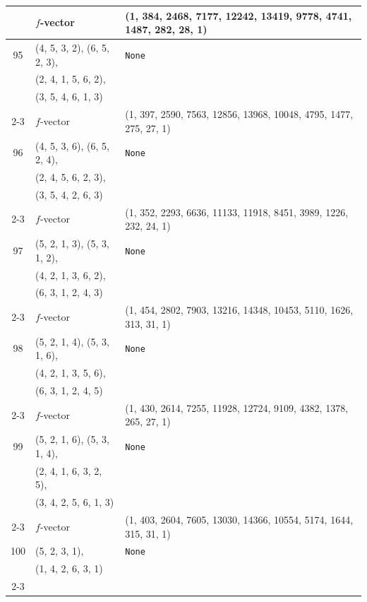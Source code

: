 \documentclass[10pt]{amsart}
\numberwithin{equation}{section}
\theoremstyle{plain}
\theoremstyle{definition}
\theoremstyle{remark}
\begin{document}
{\begin{longtable}{c|l|l}
		& $f$-vector & {(1, 384, 2468, 7177, 12242, 13419, 9778, 4741, 1487, 282, 28, 1)} \\
		\midrule
		
		95 & (4, 5, 3, 2), (6, 5, 2, 3), & \texttt{None} \\
		& (2, 4, 1, 5, 6, 2), &  \\
		& (3, 5, 4, 6, 1, 3) &  \\ \cline{2-3}
		
		& $f$-vector & {(1, 397, 2590, 7563, 12856, 13968, 10048, 4795, 1477, 275, 27, 1)} \\
		\midrule
		
		96 & (4, 5, 3, 6), (6, 5, 2, 4), & \texttt{None} \\
		& (2, 4, 5, 6, 2, 3), &  \\
		& (3, 5, 4, 2, 6, 3) &  \\ \cline{2-3}
		
		& $f$-vector & {(1, 352, 2293, 6636, 11133, 11918, 8451, 3989, 1226, 232, 24, 1)} \\
		\midrule
		
		97 & (5, 2, 1, 3), (5, 3, 1, 2), & \texttt{None} \\
		& (4, 2, 1, 3, 6, 2), &  \\
		& (6, 3, 1, 2, 4, 3) &  \\ \cline{2-3}
		
		& $f$-vector & {(1, 454, 2802, 7903, 13216, 14348, 10453, 5110, 1626, 313, 31, 1)} \\
		\midrule
		
		98 & (5, 2, 1, 4), (5, 3, 1, 6), & \texttt{None} \\
		& (4, 2, 1, 3, 5, 6), &  \\
		& (6, 3, 1, 2, 4, 5) &  \\ \cline{2-3}
		
		& $f$-vector & {(1, 430, 2614, 7255, 11928, 12724, 9109, 4382, 1378, 265, 27, 1)} \\
		\midrule
		
		99 & (5, 2, 1, 6), (5, 3, 1, 4), & \texttt{None} \\
		& (2, 4, 1, 6, 3, 2, 5), &  \\
		& (3, 4, 2, 5, 6, 1, 3) &  \\ \cline{2-3}
		
		& $f$-vector & {(1, 403, 2604, 7605, 13030, 14366, 10554, 5174, 1644, 315, 31, 1)} \\
		\midrule
		
		100 & (5, 2, 3, 1), & \texttt{None} \\
		& (1, 4, 2, 6, 3, 1) &  \\ \cline{2-3}
		

\end{longtable}}
\end{document}
